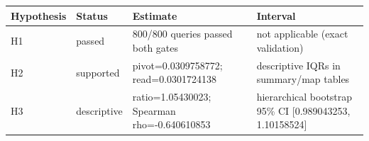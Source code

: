 \begin{tabular}{llll}
\toprule
Hypothesis & Status & Estimate & Interval \\
\midrule
H1 & passed & 800/800 queries passed both gates & not applicable (exact validation) \\
H2 & supported & pivot=0.0309758772; read=0.0301724138 & descriptive IQRs in summary/map tables \\
H3 & descriptive & ratio=1.05430023; Spearman rho=-0.640610853 & hierarchical bootstrap 95\% CI [0.989043253, 1.10158524] \\
\bottomrule
\end{tabular}
